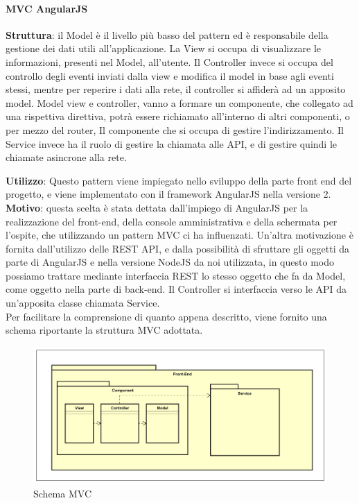 \documentclass[../DefinizioneDiProdotto_v2.0.0.tex]{subfiles}
\begin{document}
\paragraph{MVC AngularJS}\mbox{}
\begin{addmargin}[1em]{2em}%
	\textbf{Struttura}: il Model è il livello più basso del pattern ed è responsabile della gestione dei dati utili all'applicazione.
	La View si occupa di visualizzare le informazioni, presenti nel Model, all'utente.
	Il Controller invece si occupa del controllo degli eventi inviati dalla view e modifica il model in base agli eventi stessi, mentre per reperire i dati alla rete, il controller si affiderà ad un apposito model.
	Model view e controller, vanno a formare un componente, che collegato ad una rispettiva direttiva, potrà essere richiamato all'interno di altri componenti, o per mezzo del router, Il componente che si occupa di gestire l'indirizzamento.
	Il Service invece ha il ruolo di gestire la chiamata alle API, e di gestire quindi le chiamate asincrone alla rete.

	\textbf{Utilizzo}: Questo pattern viene impiegato nello sviluppo della parte front end del progetto, e viene implementato con il framework AngularJS nella versione 2.\\
	\textbf{Motivo}: questa scelta è stata dettata dall'impiego di AngularJS per la realizzazione del front-end, della console amministrativa e della schermata per l'ospite, che utilizzando un pattern MVC ci ha influenzati. Un'altra motivazione è fornita dall'utilizzo delle REST API, e dalla possibilità di sfruttare gli oggetti da parte di AngularJS e nella versione NodeJS da noi utilizzata, in questo modo possiamo trattare mediante interfaccia REST lo stesso oggetto che fa da Model, come oggetto nella parte di back-end. Il Controller si interfaccia verso le API da un'apposita classe chiamata Service.\\
	Per facilitare la comprensione di quanto appena descritto, viene fornito una schema riportante la struttura MVC adottata.
\end{addmargin}
\newpage
\begin{figure}[!h]
	\centering
	\includegraphics[width=\textwidth]{Architettura/MVC.png}
	\caption{Schema MVC}
\end{figure}
\end{document}
